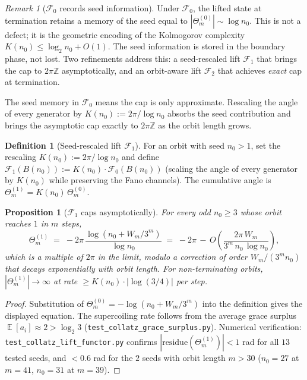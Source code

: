 \documentclass[11pt,a4paper]{article}
\theoremstyle{plain}
\newtheorem{proposition}[theorem]{Proposition}
\theoremstyle{definition}
\newtheorem{definition}[theorem]{Definition}
\theoremstyle{remark}
\newtheorem{remark}[theorem]{Remark}
\numberwithin{equation}{section}
\newcommand{\Z}{\mathbb{Z}}
\DeclareMathOperator{\E}{\mathbb{E}}
\begin{document}
\begin{remark}[$\mathcal{F}_0$ records seed information]
\label{rmk:F0-records-seed}
Under $\mathcal{F}_0$, the lifted state at termination retains a
memory of the seed equal to $|\Theta_m^{(0)}|\sim\log n_0$.  This is
not a defect; it is the geometric encoding of the Kolmogorov
complexity $K(n_0)\le\log_2 n_0+O(1)$.  The seed information is
stored in the boundary phase, not lost.  Two refinements address
this: a seed-rescaled lift $\mathcal{F}_1$ that brings the cap to
$2\pi\Z$ asymptotically, and an orbit-aware lift $\mathcal{F}_2$
that achieves \emph{exact} cap at termination.
\end{remark}

\medskip\noindent The seed memory in \(\mathcal{F}_0\) means the cap
is only approximate.  Rescaling the angle of every generator by
\(K(n_0):=2\pi/\log n_0\) absorbs the seed contribution and brings
the asymptotic cap exactly to \(2\pi\Z\) as the orbit length grows.

\begin{definition}[Seed-rescaled lift $\mathcal{F}_1$]
\label{def:seed-rescaled-lift-F1}
For an orbit with seed $n_0>1$, set the rescaling
$K(n_0):=2\pi/\log n_0$ and define
$\mathcal{F}_1(B(n_0)):=K(n_0)\cdot\mathcal{F}_0(B(n_0))$
(scaling the angle of every generator by $K(n_0)$ while preserving
the Fano channels).  The cumulative angle is
$\Theta_m^{(1)}=K(n_0)\,\Theta_m^{(0)}$.
\end{definition}

\begin{proposition}[$\mathcal{F}_1$ caps asymptotically]
\label{prop:F1-asymptotic-cap}
For every odd $n_0\ge 3$ whose orbit reaches $1$ in $m$ steps,
\[
  \Theta_m^{(1)}\;=\;-2\pi\,\frac{\log(n_0+W_m/3^m)}{\log n_0}
  \;=\;-2\pi\,-\,O\!\left(\frac{2\pi\,W_m}{3^m\,n_0\,\log n_0}\right),
\]
which is a multiple of $2\pi$ in the limit, modulo a correction of
order $W_m/(3^m n_0)$ that decays exponentially with orbit length.
For non-terminating orbits, $|\Theta_m^{(1)}|\to\infty$ at rate
$\ge K(n_0)\cdot|\log(3/4)|$ per step.
\end{proposition}

\begin{proof}
Substitution of $\Theta_m^{(0)}=-\log(n_0+W_m/3^m)$ into the
definition gives the displayed equation.  The supercoiling rate
follows from the average grace surplus
$\E[a_i]\approx 2 > \log_2 3$
(\texttt{test\_collatz\_grace\_surplus.py}).  Numerical
verification: \texttt{test\_collatz\_lift\_functor.py} confirms
$|\mathrm{residue}(\Theta_m^{(1)})|<1$ rad for all $13$ tested
seeds, and $<0.6$ rad for the $2$ seeds with orbit length $m>30$
($n_0=27$ at $m=41$, $n_0=31$ at $m=39$).
\end{proof}
\end{document}
